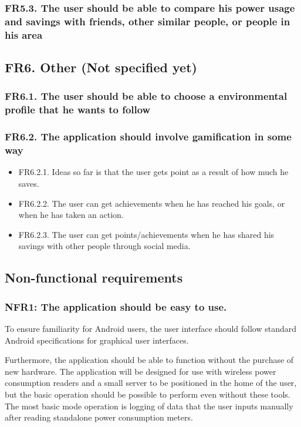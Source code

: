 \subsubsection{FR5.3. The user should be able to compare his power usage and savings with friends, other similar people, or people in his area}

\subsection{FR6. Other (Not specified yet)}
\subsubsection{FR6.1. The user should be able to choose a environmental profile that he wants to follow}
\subsubsection{FR6.2. The application should involve gamification in some way}
\begin{itemize}
\item FR6.2.1. Ideas so far is that the user gets point as a result of how much he saves.
\item FR6.2.2. The user can get achievements when he has reached his goals, or when he has taken an action.
\item FR6.2.3. The user can get points/achievements when he has shared his savings with other people through social media.
\end{itemize}


\subsection{Non-functional requirements}

\subsubsection{NFR1: The application should be easy to use.}
To ensure familiarity for Android users, the user interface should follow standard Android specifications for graphical user interfaces.
 
Furthermore, the application should be able to function without the purchase of new hardware. The application will be designed for use with wireless power consumption readers and a small server to be positioned in the home of the user, but the basic operation should be possible to perform even without these tools. The most basic mode operation is logging of data that 
the user inputs manually after reading standalone power consumption meters.
 
